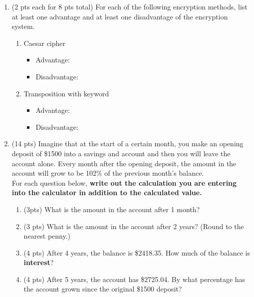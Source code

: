 \documentclass[12pt]{article}
\renewcommand{\emph}[1]{\textsf{\textbf{#1}}}
\begin{document}
\begin{enumerate}
\newpage
\item (2 pts each for 8 pts total) For each of the following encryption methods, list at
least one advantage and at least one disadvantage of the encryption
system.
	\begin{enumerate}
	\item Caesar cipher
  		\begin{itemize}
 		 \item Advantage: %
    \vfill
 		 \item Disadvantage: %
      \vfill
  		\end{itemize}
	\item Transposition with keyword
 		 \begin{itemize}
  		\item Advantage: %
   \vfill
  		\item Disadvantage: %
      \vfill
  		\end{itemize}
	\end{enumerate}
\vfill
\newpage
\item (14 pts) Imagine that at the start of a certain month, you make an opening deposit of \$1500 into a savings and account and then you will leave the account alone. Every month after the opening deposit, the amount in the account will grow to be 102\% of the previous month's balance.\\

For each question below, \textbf{write out the calculation you are entering into the calculator in addition to the calculated value.}
	\begin{enumerate}
	\item (3pts) What is the amount in the account after 1 month?
	\vfill
	\item (3 pts) What is the amount in the account after 2 years? (Round to the nearest penny.)
	\vfill
	\item (4 pts) After 4 years, the balance is \$2418.35. How much of the balance is \emph{interest}?
	\vfill
	\item (4 pts) After 5 years, the account has  \$2725.04. By what percentage has the account grown since the original \$1500 deposit? 	
	\vfill
	\end{enumerate}
\vfill
\newpage


\end{enumerate}
\end{document}
